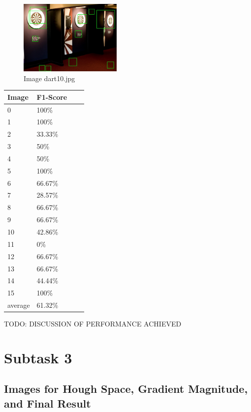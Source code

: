 \documentclass[conference]{IEEEtran}
\begin{document}
\begin{figure}[ht!]
	\centering
	\includegraphics[width=50mm]{img/Viola_Jones_Darts/detected_dart10.jpg}
	\caption{Image dart10.jpg \label{img_dart_10}}
\end{figure}

\begin{center}
	\begin{tabular}{| l | l | l | l |}
		\hline
		Image & F1-Score \\ \hline
	    0 & 100\% \\ \hline
		1 & 100\% \\ \hline
		2 & 33.33\% \\ \hline
		3 &  50\%\\ \hline
		4 & 50\% \\ \hline
		5 & 100\% \\ \hline
		6 & 66.67\% \\ \hline
		7 & 28.57\% \\ \hline
		8 & 66.67\% \\ \hline
		9 & 66.67\% \\ \hline
		10 & 42.86\% \\ \hline
		11 & 0\% \\ \hline
		12 & 66.67\% \\ \hline
		13 & 66.67\% \\ \hline
		14 & 44.44\% \\ \hline
		15 & 100\% \\ \hline
		average & 61.32\% \\ \hline
	\end{tabular}
\end{center}

TODO: DISCUSSION OF PERFORMANCE ACHIEVED
\newpage

\section{Subtask 3}

\subsection{Images for Hough Space, Gradient Magnitude, and Final Result}
\end{document}
